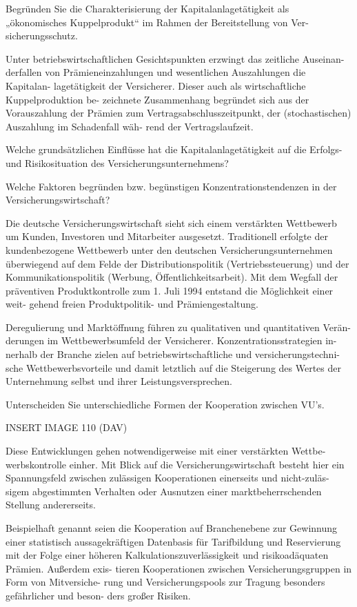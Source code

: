 Begründen Sie die Charakterisierung der Kapitalanlagetätigkeit als
„ökonomisches Kuppelprodukt“ im Rahmen der Bereitstellung von Ver-
sicherungsschutz.

Unter betriebswirtschaftlichen Gesichtspunkten erzwingt das zeitliche Auseinan-
derfallen von Prämieneinzahlungen und wesentlichen Auszahlungen die Kapitalan-
lagetätigkeit der Versicherer. Dieser auch als wirtschaftliche Kuppelproduktion be-
zeichnete Zusammenhang begründet sich aus der Vorauszahlung der Prämien zum
Vertragsabschlusszeitpunkt, der (stochastischen) Auszahlung im Schadenfall wäh-
rend der Vertragslaufzeit.


Welche grundsätzlichen Einflüsse hat die Kapitalanlagetätigkeit auf die
Erfolgs- und Risikosituation des Versicherungsunternehmens?



Welche Faktoren begründen bzw. begünstigen Konzentrationstendenzen 
in der Versicherungswirtschaft?


Die deutsche Versicherungswirtschaft sieht sich einem verstärkten Wettbewerb
um Kunden, Investoren und Mitarbeiter ausgesetzt. Traditionell erfolgte der
kundenbezogene Wettbewerb unter den deutschen Versicherungsunternehmen
überwiegend auf dem Felde der Distributionspolitik (Vertriebssteuerung) und der
Kommunikationspolitik (Werbung, Öffentlichkeitsarbeit). Mit dem Wegfall der
präventiven Produktkontrolle zum 1. Juli 1994 entstand die Möglichkeit einer weit-
gehend freien Produktpolitik- und Prämiengestaltung.


Deregulierung und Marktöffnung führen zu qualitativen und quantitativen Verän-
derungen im Wettbewerbsumfeld der Versicherer. Konzentrationsstrategien in-
nerhalb der Branche zielen auf betriebswirtschaftliche und versicherungstechni-
sche Wettbewerbsvorteile und damit letztlich auf die Steigerung des Wertes der
Unternehmung selbst und ihrer Leistungsversprechen.



Unterscheiden Sie unterschiedliche Formen der Kooperation zwischen VU's.

INSERT IMAGE 110 (DAV)

Diese Entwicklungen gehen notwendigerweise mit einer verstärkten Wettbe-
werbskontrolle einher. Mit Blick auf die Versicherungswirtschaft besteht hier ein
Spannungsfeld zwischen zulässigen Kooperationen einerseits und nicht-zuläs-
sigem abgestimmten Verhalten oder Ausnutzen einer marktbeherrschenden
Stellung andererseits.

Beispielhaft
genannt seien die Kooperation auf Branchenebene zur Gewinnung einer statistisch
aussagekräftigen Datenbasis für Tarifbildung und Reservierung mit der Folge einer
höheren Kalkulationszuverlässigkeit und risikoadäquaten Prämien. Außerdem exis-
tieren Kooperationen zwischen Versicherungsgruppen in Form von Mitversiche-
rung und Versicherungspools zur Tragung besonders gefährlicher und beson-
ders großer Risiken.
